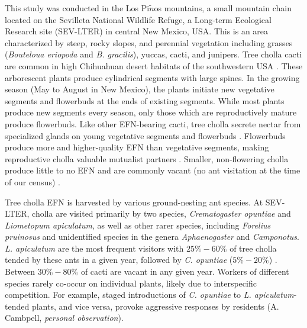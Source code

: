 \documentclass[11pt]{article}
\begin{document}
This study was conducted in the Los Pi$\tilde{n}$os mountains, a small mountain chain located on the Sevilleta National Wildlife Refuge, a Long-term Ecological Research site (SEV-LTER) in central New Mexico, USA.
This is an area characterized by steep, rocky slopes, and perennial vegetation including grasses (\textit{Bouteloua eriopoda} and \textit{B. gracilis}), yuccas, cacti, and junipers. 
Tree cholla cacti are common in high Chihuahuan desert habitats of the southwestern USA \citep{Benson1982}. 
These arborescent plants produce cylindrical segments with large spines. 
In the growing season (May to August in New Mexico), the plants initiate new vegetative segments and flowerbuds at the ends of existing segments. 
While most plants produce new segments every season, only those which are reproductively mature produce flowerbuds. 
Like other EFN-bearing cacti, tree cholla secrete nectar from specialized glands on young vegetative segments and flowerbuds \citep{Ness2006,Oliveira1999}. 
Flowerbuds produce more and higher-quality EFN than vegetative segments, making reproductive cholla valuable mutualist partners \citep{Miller2014}. 
Smaller, non-flowering cholla produce little to no EFN and are commonly vacant (no ant visitation at the time of our census) \citep{Miller2014}. 

Tree cholla EFN is harvested by various ground-nesting ant species. 
At SEV-LTER, cholla are visited primarily by two species, \textit{Crematogaster opuntiae} and \textit{Liometopum apiculatum}, as well as other rarer species, including \textit{Forelius pruinosus} and unidentified species in the genera \textit{Aphaenogaster} and \textit{Camponotus}.
\textit{L. apiculatum} are the most frequent visitors with $25\% - 60\%$ of tree cholla tended by these ants in a given year, followed by \textit{C. opuntiae} ($5\% - 20\%$) \citep{Donald2022}. 
Between $ 30\% - 80\%$ of cacti are vacant in any given year. 
Workers of different species rarely co-occur on individual plants, likely due to interspecific competition. 
For example, staged introductions of \textit{C. opuntiae} to \textit{L. apiculatum}-tended plants, and vice versa, provoke aggressive responses by residents (A. Cambpell, \textit{personal observation}).
\end{document}

